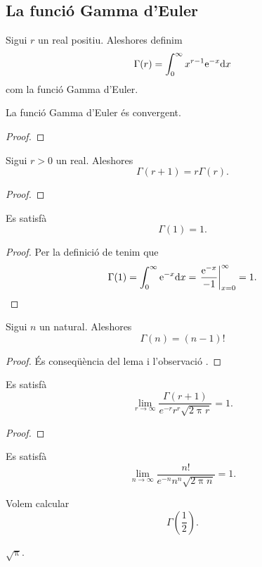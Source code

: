 \documentclass[../Apunts.tex]{subfiles}
\begin{document}
	\subsection{La funció Gamma d'Euler}
	\begin{definition}
		\label{def:Gamma d'Euler}
		Sigui \(r\) un real positiu. Aleshores definim
		\[\Gamma(r)=\int_{0}^{\infty}x^{r-1}\mathrm{e}^{-x}\mathrm{d} x\]
		com la funció Gamma d'Euler.
	\end{definition}
	\begin{theorem}
		\label{thm:la funció Gamma d'Euler és convergent}
		La funció Gamma d'Euler és convergent.
		\begin{proof}
		\end{proof}
	\end{theorem}
	\begin{lemma} %
		\label{lema:la Gamma d'Euler es comporta com un factorial amb reals}
		Sigui \(r>0\) un real. Aleshores
		\[\Gamma(r+1)=r\Gamma(r).\]
		\begin{proof}
		\end{proof}
	\end{lemma}
	\begin{observation}
		\label{obs:valor n=1 per la Gamma d'Euler}
		Es satisfà
		\[\Gamma(1)=1.\]
		\begin{proof} %
			Per la definició de  tenim que
			\[\Gamma(1)=\int_{0}^{\infty}\e^{-x}\diff x=\left.\frac{\e^{-x}}{-1}\right\vert_{x=0}^{\infty}=1.\qedhere\]
		\end{proof}
	\end{observation}
	\begin{lemma} %
		\label{lema:la Gamma d'Euler es comporta com un factorial}
		Sigui \(n\) un natural. Aleshores
		\[\Gamma(n)=(n-1)!\]
		\begin{proof}
			És conseqüència del lema  i l'observació .
		\end{proof}
	\end{lemma}
	\begin{theorem}
		\label{thm:fórmula d'Stirling}
		Es satisfà
		\[\lim_{r\to\infty}\frac{\Gamma(r+1)}{e^{-r}r^{r}\sqrt{2\uppi r}}=1.\]
		\begin{proof}
		\end{proof}
	\end{theorem}
	\begin{corollary}
		\label{cor:fórmula d'Stirling}
		Es satisfà
		\[\lim_{n\to\infty}\frac{n!}{e^{-n}n^{n}\sqrt{2\uppi n}}=1.\]
	\end{corollary}
	\begin{example}
		Volem calcular
		\[\Gamma\left(\frac{1}{2}\right).\]
		\begin{solution}
			\(\sqrt{\uppi}\). %
		\end{solution}
	\end{example}
\end{document}
